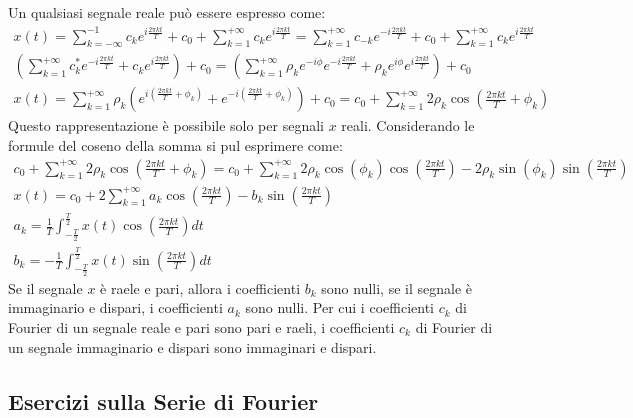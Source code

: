 \documentclass{article}
\numberwithin{equation}{subsection}
\begin{document}
Un qualsiasi segnale reale può essere espresso come:
\begin{gather*}
    x(t)=\displaystyle\sum_{k=-\infty}^{-1}c_ke^{i\frac{2\pi kt}{T}}+c_0+\sum_{k=1}^{+\infty}c_ke^{i\frac{2\pi kt}{T}}=\sum_{k=1}^{+\infty}c_{-k}e^{-i\frac{2\pi kt}{T}}+c_0+\sum_{k=1}^{+\infty}c_ke^{i\frac{2\pi kt}{T}}\\
    \displaystyle\left(\sum_{k=1}^{+\infty}c_k^*e^{-i\frac{2\pi kt}{T}}+c_ke^{i\frac{2\pi kt}{T}}\right)+c_0=\left(\sum_{k=1}^{+\infty}\rho_k e^{-i\phi}e^{-i\frac{2\pi kt}{T}}+\rho_ke^{i\phi}e^{i\frac{2\pi kt}{T}}\right)+c_0\\
    x(t)=\displaystyle\sum_{k=1}^{+\infty}\rho_k \left(e^{i\left(\frac{2\pi kt}{T}+\phi_k\right)}+e^{-i\left(\frac{2\pi kt}{T}+\phi_k\right)}\right)+c_0=\displaystyle c_0+\sum_{k=1}^{+\infty}2\rho_k\cos\left(\frac{2\pi kt}{T}+\phi_k\right)
\end{gather*}
Questo rappresentazione è possibile solo per segnali $x$ reali. 
Considerando le formule del coseno della somma si pul esprimere come:
\begin{gather*}
    \displaystyle c_0+\sum_{k=1}^{+\infty}2\rho_k\cos\left(\frac{2\pi kt}{T}+\phi_k\right)=
    c_0+\sum_{k=1}^{+\infty}2\rho_k\cos(\phi_k)\cos\left(\frac{2\pi kt}{T}\right)-2\rho_k\sin(\phi_k)\sin\left(\frac{2\pi kt}{T}\right)\\
    x(t)=\displaystyle c_0+2\sum_{k=1}^{+\infty}a_k\cos\left(\frac{2\pi kt}{T}\right)-b_k\sin\left(\frac{2\pi kt}{T}\right)\\
    a_k=\displaystyle\frac{1}{T}\int_{-\frac{T}{2}}^{\frac{T}{2}}x(t)\cos\left(\frac{2\pi kt}{T}\right)dt\\
    b_k=\displaystyle-\frac{1}{T}\int_{-\frac{T}{2}}^{\frac{T}{2}}x(t)\sin\left(\frac{2\pi kt}{T}\right)dt
\end{gather*}
Se il segnale $x$ è raele e pari, allora i coefficienti $b_k$ sono nulli, se il segnale è immaginario e dispari, i coefficienti $a_k$ sono nulli. 
Per cui i coefficienti $c_k$ di Fourier di un segnale reale e pari sono pari e raeli, i coefficienti $c_k$ di Fourier di un segnale immaginario e 
dispari sono immaginari e dispari. 

\subsection{Esercizi sulla Serie di Fourier}
\end{document}
